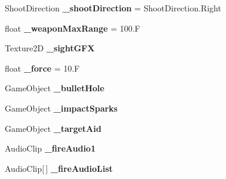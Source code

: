 \begin{DoxyCompactItemize}
\item 
\hypertarget{class_f_p_s_control_1_1_gun_logic_a7ba294c2ea392321697a7f5fb28e788f}{Shoot\-Direction {\bfseries \-\_\-shoot\-Direction} = Shoot\-Direction.\-Right}\label{class_f_p_s_control_1_1_gun_logic_a7ba294c2ea392321697a7f5fb28e788f}

\item 
\hypertarget{class_f_p_s_control_1_1_gun_logic_acc349588bcd33418a5bbcf3afa5a75c3}{float {\bfseries \-\_\-weapon\-Max\-Range} = 100.\-F}\label{class_f_p_s_control_1_1_gun_logic_acc349588bcd33418a5bbcf3afa5a75c3}

\item 
\hypertarget{class_f_p_s_control_1_1_gun_logic_ab66da691105f435eed03940c8d331e94}{Texture2\-D {\bfseries \-\_\-sight\-G\-F\-X}}\label{class_f_p_s_control_1_1_gun_logic_ab66da691105f435eed03940c8d331e94}

\item 
\hypertarget{class_f_p_s_control_1_1_gun_logic_a5e8c033095207a3dec63fc8bb65ca5be}{float {\bfseries \-\_\-force} = 10.\-F}\label{class_f_p_s_control_1_1_gun_logic_a5e8c033095207a3dec63fc8bb65ca5be}

\item 
\hypertarget{class_f_p_s_control_1_1_gun_logic_a3a35c71eeae45980c6be7cf915b3f799}{Game\-Object {\bfseries \-\_\-bullet\-Hole}}\label{class_f_p_s_control_1_1_gun_logic_a3a35c71eeae45980c6be7cf915b3f799}

\item 
\hypertarget{class_f_p_s_control_1_1_gun_logic_a74bb28180a3e6eced59837821163de3d}{Game\-Object {\bfseries \-\_\-impact\-Sparks}}\label{class_f_p_s_control_1_1_gun_logic_a74bb28180a3e6eced59837821163de3d}

\item 
\hypertarget{class_f_p_s_control_1_1_gun_logic_adfd6916f925e979700b4ababada6f467}{Game\-Object {\bfseries \-\_\-target\-Aid}}\label{class_f_p_s_control_1_1_gun_logic_adfd6916f925e979700b4ababada6f467}

\item 
\hypertarget{class_f_p_s_control_1_1_gun_logic_a1849e66b7c93502a6cb58b16ad5a9704}{Audio\-Clip {\bfseries \-\_\-fire\-Audio1}}\label{class_f_p_s_control_1_1_gun_logic_a1849e66b7c93502a6cb58b16ad5a9704}

\item 
\hypertarget{class_f_p_s_control_1_1_gun_logic_ac378400c2d9a7d6483ffcae3473b9721}{Audio\-Clip\mbox{[}$\,$\mbox{]} {\bfseries \-\_\-fire\-Audio\-List}}\label{class_f_p_s_control_1_1_gun_logic_ac378400c2d9a7d6483ffcae3473b9721}


\end{DoxyCompactItemize}
